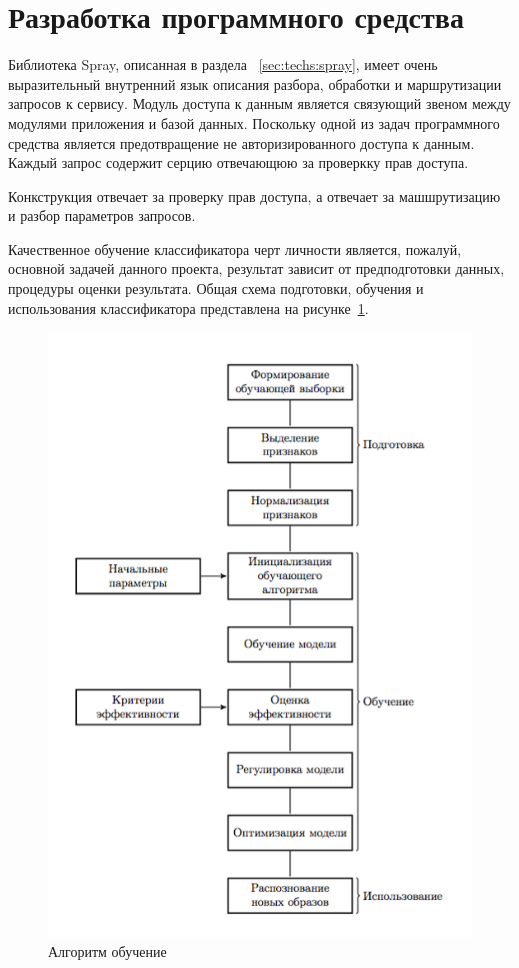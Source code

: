 \section{Разработка программного средства}
Библиотека Spray, описанная в раздела ~\ref{sec:techs:spray}, имеет очень выразительный внутренний язык описания разбора, обработки и маршрутизации запросов к сервису. Модуль доступа к данным является связующий звеном между модулями приложения и базой данных. Поскольку одной из задач программного средства является предотвращение не авторизированного доступа к данным. Каждый запрос содержит серцию отвечающюю за проверкку прав доступа.

Конкструкция  отвечает за проверку прав доступа, а  отвечает за машшрутизацию и разбор параметров запросов.

Качественное обучение классификатора черт личности является, пожалуй, основной задачей данного проекта, результат зависит от предподготовки данных, процедуры оценки результата. Общая схема подготовки, обучения и использования классификатора представлена на рисунке~\ref{fig:develoipment:svm_flow}.

\begin{figure}[ht]
    \centering
    \label{fig:develoipment:svm_flow}
    \includegraphics[width=1\textwidth]{figures/SVM_flow.png}
    \caption{Алгоритм обучение}
\end{figure}

